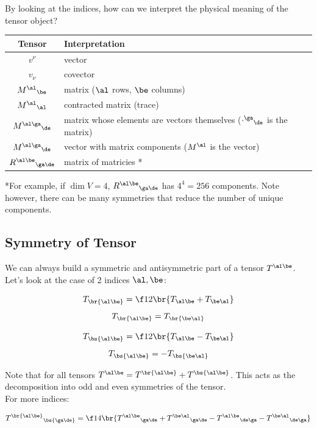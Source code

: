 \documentclass{article}
\begin{document}
By looking at the indices, how can we interpret the physical meaning of the tensor object? \\

\begin{tabular}{c|l}
    Tensor & Interpretation \\
    \hline
    $v^\nu$ & vector \\
    $v_\nu$ & covector \\
    ${M^\al}_\be$ & matrix ($\al$ rows, $\be$ columns) \\
    ${M^\al}_\al$ & contracted matrix (trace) \\
    ${M^{\al\ga}}_\de$ & matrix whose elements are vectors themselves (${\cdot^\ga}_\de$ is the matrix) \\
    ${M^{\al\ga}}_\de$ & vector with matrix components (${M^\al}$ is the vector) \\
    ${R^{\al\be}}_{\ga\de}$ & matrix of matricies *\\
\end{tabular}
\vspace{0.1in}

*For example, if $\dim V = 4$, ${R^{\al\be}}_{\ga\de}$ has $4^4 = 256$ components. Note however, there can be many symmetries that reduce the number of unique components.

\subsection{Symmetry of Tensor}

We can always build a symmetric and antisymmetric part of a tensor $T^{\al\be}$. Let's look at the case of 2 indices $\al, \be$:


\[ T_{\br{\al\be}} = \f12 \br{T_{\al\be} + T_{\be\al}} \]
\[ T_{\br{\al\be}} = T_{\br{\be\al}}  \]


\[ T_{\bs{\al\be}} = \f12 \br{T_{\al\be} - T_{\be\al}} \]
\[ T_{\bs{\al\be}} = - T_{\bs{\be\al}}  \]

Note that for all tensors $T^{\al\be} = T^{\br{\al\be}} + T^{\bs{\al\be}}$. This acts as the decomposition into odd and even symmetries of the tensor. \\

For more indices:

\[ {T^{\br{\al\be}}}_{\bs{\ga\de}} = \f14\br{{T^{\al\be}}_{\ga\de} + {T^{\be\al}}_{\ga\de} - {T^{\al\be}}_{\de\ga} - {T^{\be\al}}_{\de\ga}} \]
\end{document}
